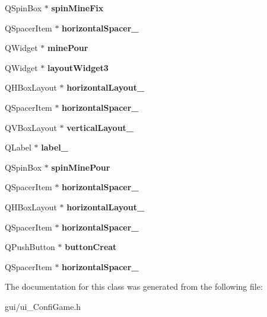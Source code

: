 \begin{DoxyCompactItemize}
Q\+Spin\+Box $\ast$ {\bfseries spin\+Mine\+Fix}
\item 
\mbox{\label{class_ui___confi_game_a47b27a78745c149c66e2cad4f6389c3c}} 
Q\+Spacer\+Item $\ast$ {\bfseries horizontal\+Spacer\+\_}
\item 
\mbox{\label{class_ui___confi_game_aa2fbcbeff748c4fee9044d299b18e82b}} 
Q\+Widget $\ast$ {\bfseries mine\+Pour}
\item 
\mbox{\label{class_ui___confi_game_aced37263c465ea85d5cec33b66ec6bf9}} 
Q\+Widget $\ast$ {\bfseries layout\+Widget3}
\item 
\mbox{\label{class_ui___confi_game_ad3a927edf512911313e374ad55f0c132}} 
Q\+H\+Box\+Layout $\ast$ {\bfseries horizontal\+Layout\+\_}
\item 
\mbox{\label{class_ui___confi_game_a4df3abdbdc07333ac571092eed9a4f75}} 
Q\+Spacer\+Item $\ast$ {\bfseries horizontal\+Spacer\+\_}
\item 
\mbox{\label{class_ui___confi_game_abd1c563c6eea2b38efc0e354c1266848}} 
Q\+V\+Box\+Layout $\ast$ {\bfseries vertical\+Layout\+\_}
\item 
\mbox{\label{class_ui___confi_game_aa03510e2f84098b823ddff11e571e3d2}} 
Q\+Label $\ast$ {\bfseries label\+\_}
\item 
\mbox{\label{class_ui___confi_game_a403733d9f3af982234253feb8703676a}} 
Q\+Spin\+Box $\ast$ {\bfseries spin\+Mine\+Pour}
\item 
\mbox{\label{class_ui___confi_game_a4b4edbd685d72c06fe341e4a6ccfa9dc}} 
Q\+Spacer\+Item $\ast$ {\bfseries horizontal\+Spacer\+\_}
\item 
\mbox{\label{class_ui___confi_game_a13ae963320b566790dd1614052ff500f}} 
Q\+H\+Box\+Layout $\ast$ {\bfseries horizontal\+Layout\+\_}
\item 
\mbox{\label{class_ui___confi_game_a6a7297d0ed957a109807d8c277e7d643}} 
Q\+Spacer\+Item $\ast$ {\bfseries horizontal\+Spacer\+\_}
\item 
\mbox{\label{class_ui___confi_game_a5bed1a1dcfcf301e924f5bced5f97c60}} 
Q\+Push\+Button $\ast$ {\bfseries button\+Creat}
\item 
\mbox{\label{class_ui___confi_game_a2a3a274f282b4b2418bfccff213d874a}} 
Q\+Spacer\+Item $\ast$ {\bfseries horizontal\+Spacer\+\_}
\end{DoxyCompactItemize}


The documentation for this class was generated from the following file\+:\begin{DoxyCompactItemize}
\item 
gui/ui\+\_\+\+Confi\+Game.\+h\end{DoxyCompactItemize}
